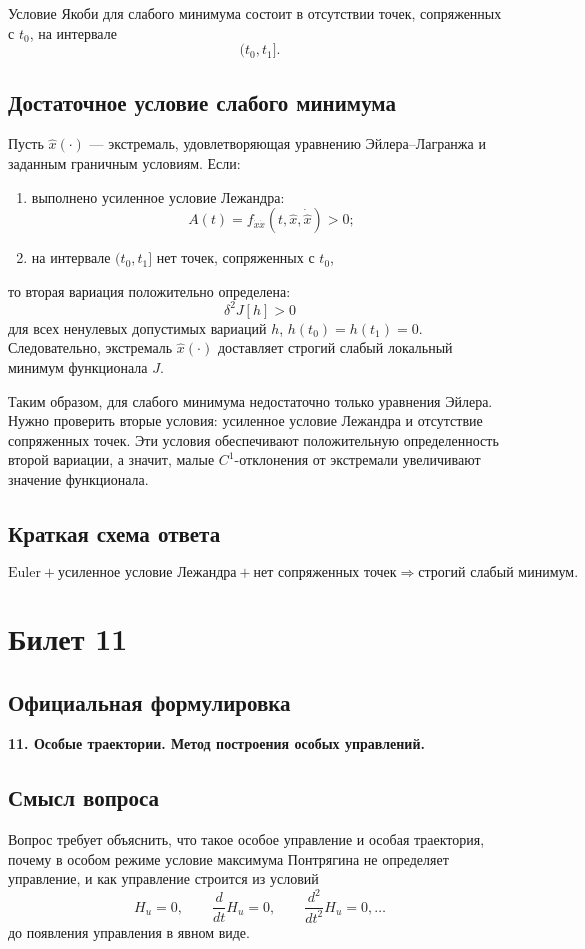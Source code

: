 \documentclass[12pt,a4paper]{article}
\begin{document}
Условие Якоби для слабого минимума состоит в отсутствии точек, сопряженных с $t_0$, на интервале
\[
(t_0,t_1].
\]

\subsection*{Достаточное условие слабого минимума}
Пусть $\widehat x(\cdot)$ --- экстремаль, удовлетворяющая уравнению Эйлера--Лагранжа и заданным граничным условиям. Если:
\begin{enumerate}
    \item выполнено усиленное условие Лежандра:
    \[
    A(t)=f_{\dot x\dot x}(t,\widehat x,\dot{\widehat x})>0;
    \]
    \item на интервале $(t_0,t_1]$ нет точек, сопряженных с $t_0$,
\end{enumerate}
то вторая вариация положительно определена:
\[
\delta^2J[h]>0
\]
для всех ненулевых допустимых вариаций $h$, $h(t_0)=h(t_1)=0$. Следовательно, экстремаль $\widehat x(\cdot)$ доставляет строгий слабый локальный минимум функционала $J$.

Таким образом, для слабого минимума недостаточно только уравнения Эйлера. Нужно проверить вторые условия: усиленное условие Лежандра и отсутствие сопряженных точек. Эти условия обеспечивают положительную определенность второй вариации, а значит, малые $C^1$-отклонения от экстремали увеличивают значение функционала.

\subsection*{Краткая схема ответа}
\[
\text{Euler}+
\text{усиленное условие Лежандра}+
\text{нет сопряженных точек}
\Rightarrow
\text{строгий слабый минимум}.
\]

\newpage
\section*{Билет 11}

\subsection*{Официальная формулировка}
\textbf{11. Особые траектории. Метод построения особых управлений.}

\subsection*{Смысл вопроса}
Вопрос требует объяснить, что такое особое управление и особая траектория, почему в особом режиме условие максимума Понтрягина не определяет управление, и как управление строится из условий
\[
H_u=0,\qquad \frac{d}{dt}H_u=0,\qquad \frac{d^2}{dt^2}H_u=0,\ldots
\]
до появления управления в явном виде.
\end{document}
